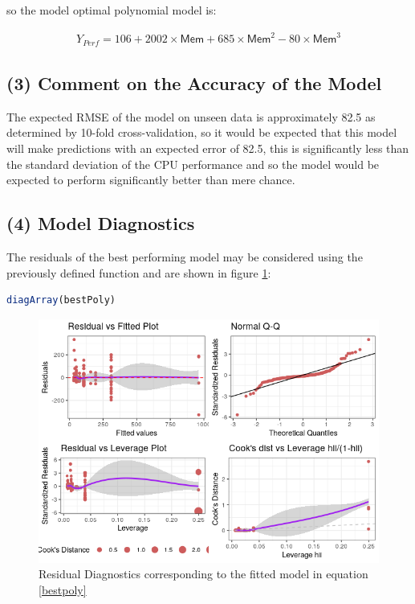 \documentclass[
]{article}
\begin{document}
so the model optimal polynomial model is:

\begin{align}
Y_{Perf} = 106 + 2002 \times \textsf{Mem} + 685 \times \textsf{Mem}^2 -80 \times \textsf{Mem}^3 \label{bestpoly}
\end{align}


\hypertarget{comment-on-the-accuracy-of-the-model}{%
\subsection{(3) Comment on the Accuracy of the
Model}\label{comment-on-the-accuracy-of-the-model}}

The expected RMSE of the model on unseen data is approximately 82.5 as
determined by 10-fold cross-validation, so it would be expected that
this model will make predictions with an expected error of 82.5, this is
significantly less than the standard deviation of the CPU performance
and so the model would be expected to perform significantly better than
mere chance.

\hypertarget{model-diagnostics}{%
\subsection{(4) Model Diagnostics}\label{model-diagnostics}}

The residuals of the best performing model may be considered using the previously defined function and are shown in figure \ref{polyresd}:

\begin{lstlisting}[language=R]
diagArray(bestPoly)
\end{lstlisting}


\begin{figure}
	\centering
	\includegraphics[width=0.7\linewidth]{SecAssignment_files/figure-html/unnamed-chunk-31-1.png}
	\caption{Residual Diagnostics corresponding to the fitted model in equation \eqref{bestpoly}}
	\label{polyresd}
\end{figure}
\end{document}
